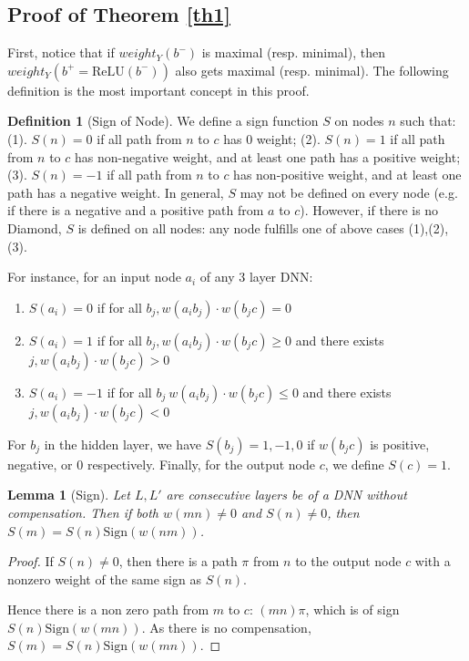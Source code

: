\documentclass[]{article}
\newtheorem{lemma}{Lemma}
\theoremstyle{definition}
\newtheorem{definition}{Definition}
\newcommand{\ReLU}{\mathrm{ReLU}}
\begin{document}
\subsection*{Proof of Theorem \ref{th1}}

First, notice that if $weight_Y(b^-)$ is maximal (resp. minimal), 
then $weight_Y(b^+=\ReLU(b^-))$ also gets maximal (resp. minimal).
The following definition is the most important concept in this proof.

\begin{definition}[Sign of Node]
	We define a sign function $S$ on nodes $n$ such that: 	(1). $S(n)=0$ if all path from $n$ to $c$ has 0 weight; (2). $S(n)=1$ if all path from $n$ to $c$ has non-negative weight, and at least one path has a positive weight; (3). $S(n)=-1$ if all path from $n$ to $c$ has non-positive weight, and at least one path has a negative weight. 
	In general, $S$ may not be defined on every node (e.g. if there is a negative and a positive path from $a$ to $c$). However, if there is no Diamond, $S$ is defined on all nodes: any node fulfills one of above cases (1),(2),(3).


	For instance, for an input node $a_i$ of any 3 layer DNN:
	\begin{enumerate}
      \item  $S(a_i)=0$ if 
	  for all $b_j, w(a_i b_j)\cdot w(b_j c) = 0$
	
	
	 \item  $S(a_i)=1$ if for all $b_j, w(a_i b_j)\cdot w(b_j c) \geq 0$ and there exists 
	 $j, w(a_i b_j)\cdot w(b_j c) > 0$
	
	\item $S(a_i)=-1$ if for all $b_j\ w(a_i b_j)\cdot w(b_j c) \leq 0$ and there exists 
	$j, w(a_i b_j)\cdot w(b_j c) < 0$ 
\end{enumerate}

For $b_j$ in the hidden layer, we have $S(b_j)=1,-1,0$ if $w(b_j c)$ is positive, negative, or 0 respectively. Finally, for the output node $c$, we define $S(c)=1$.
\end{definition}


\begin{lemma}[Sign]
	\label{lemma1}
Let $L,L'$  are consecutive layers be of a DNN without compensation. 
Then if both 
$w(m n) \neq 0$ and $S(n) \neq 0$, then 
	$S(m)=S(n)\mathrm{Sign}(w(n m))$.
\end{lemma}

\begin{proof}
	If $S(n) \neq 0$, then there is a path $\pi$ from $n$ to the output node $c$ with a nonzero weight of the same sign as $S(n)$. 
	
	Hence there is a non zero path from $m$ to $c$: $(m n) \pi$, which is of sign 
	$S(n)\mathrm{Sign}(w(mn))$. As there is no compensation, $S(m)=S(n)\mathrm{Sign}(w(mn))$.
\end{proof}
\end{document}
